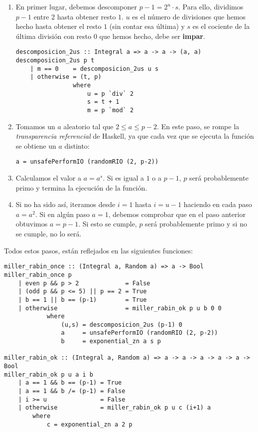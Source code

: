 \documentclass[10pt,spanish]{article}
\begin{document}
\begin{enumerate}[1.]
    \item En primer lugar, debemos descomponer $p -1 = 2^u \cdot s$. Para ello, dividimos $p-1$ entre $2$ hasta obtener resto $1$. $u$ es el número de divisiones que hemos hecho hasta obtener el resto $1$ (sin contar esa última) y $s$ es el cociente de la última división con resto $0$ que hemos hecho, debe ser \textbf{\textcolor{rojo}{impar}}.

\begin{verbatim}
descomposicion_2us :: Integral a => a -> a -> (a, a)
descomposicion_2us p t 
    | m == 0    = descomposicion_2us u s
    | otherwise = (t, p)
                where
                    u = p `div` 2
                    s = t + 1
                    m = p `mod` 2   
\end{verbatim}

    \item Tomamos un $a$ aleatorio tal que $2 \leq a \leq p-2$. En este paso, se rompe la \textit{\textcolor{rojo}{transparencia referencial}} de Haskell, ya que cada vez que se ejecuta la función se obtiene un $a$ distinto:

\begin{verbatim}
a = unsafePerformIO (randomRIO (2, p-2))
\end{verbatim}
    
    \item Calculamos el valor a $a=a^s$. Si es igual a $1$ o a $p-1$, $p$ será probablemente primo y termina la ejecución de la función.

    \item Si no ha sido así, iteramos desde $i=1$ hasta $i=u-1$ haciendo en cada paso $a = a^2$. Si en algún paso $a=1$, debemos comprobar que en el paso anterior obtuvimos $a=p-1$. Si esto se cumple, $p$ será probablemente primo y si no se cumple, no lo será.
\end{enumerate}

Todos estos pasos, están reflejados en las siguientes funciones:

\begin{verbatim}
miller_rabin_once :: (Integral a, Random a) => a -> Bool
miller_rabin_once p
    | even p && p > 2             = False
    | (odd p && p <= 5) || p == 2 = True
    | b == 1 || b == (p-1)        = True
    | otherwise                   = miller_rabin_ok p u b 0 0
            where
                (u,s) = descomposicion_2us (p-1) 0
                a     = unsafePerformIO (randomRIO (2, p-2))
                b     = exponential_zn a s p

miller_rabin_ok :: (Integral a, Random a) => a -> a -> a -> a -> a -> Bool
miller_rabin_ok p u a i b
    | a == 1 && b == (p-1) = True
    | a == 1 && b /= (p-1) = False
    | i >= u               = False
    | otherwise            = miller_rabin_ok p u c (i+1) a
        where
            c = exponential_zn a 2 p
\end{verbatim}
\end{document}
